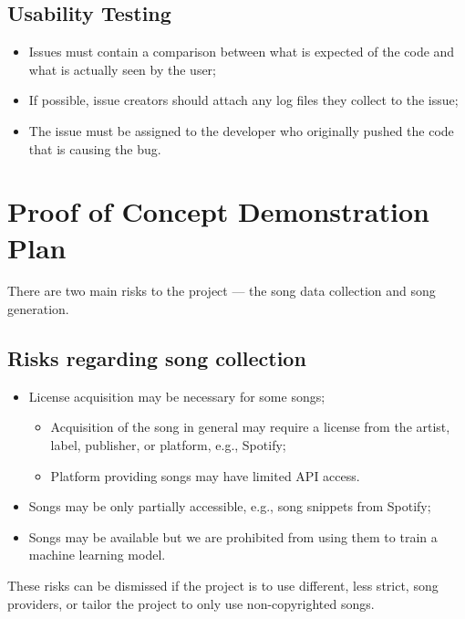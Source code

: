 \documentclass{article}
\begin{document}
\subsection{Usability Testing}
\begin{itemize}
  \item Issues must contain a comparison between what is expected of the code and what is actually seen by the user;
  \item If possible, issue creators should attach any log files they collect to the issue;
  \item The issue must be assigned to the developer who originally pushed the code that is causing the bug.
\end{itemize}

\section{Proof of Concept Demonstration Plan}
There are two main risks to the project --- the song data collection and song generation.

\subsection{Risks regarding song collection}
\begin{itemize}
  \item License acquisition may be necessary for some songs;
  \begin{itemize}
    \item Acquisition of the song in general may require a license from the artist, label, publisher, or platform, e.g., Spotify;
    \item Platform providing songs may have limited API access.
  \end{itemize}
  \item Songs may be only partially accessible, e.g., song snippets from Spotify;
  \item Songs may be available but we are prohibited from using them to train a machine learning model.
\end{itemize}
These risks can be dismissed if the project is to use different, less strict, song providers, or tailor the project to only use non-copyrighted songs.
\end{document}
